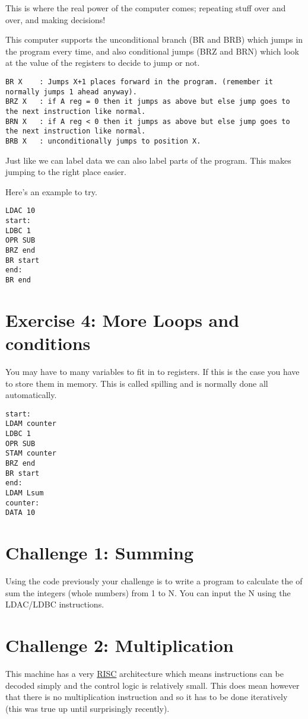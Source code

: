 \documentclass[10pt,a4paper]{article}
\begin{document}
This is where the real power of the computer comes; repeating stuff over and over, and making decisions!

This computer supports the unconditional branch (BR and BRB) which jumps in the program every time, and also conditional jumps (BRZ and BRN) which look at the value of the registers to decide to jump or not.
\begin{verbatim}
BR X	: Jumps X+1 places forward in the program. (remember it normally jumps 1 ahead anyway).
BRZ X 	: if A reg = 0 then it jumps as above but else jump goes to the next instruction like normal.
BRN X	: if A reg < 0 then it jumps as above but else jump goes to the next instruction like normal.
BRB X	: unconditionally jumps to position X.
\end{verbatim}

Just like we can label data we can also label parts of the program. This makes jumping to the right place easier.

Here's an example to try.
\begin{lstlisting}[frame=single]
LDAC 10
start:
LDBC 1
OPR SUB
BRZ end
BR start
end:
BR end
\end{lstlisting}

\section{Exercise 4: More Loops and conditions}
You may have to many variables to fit in to registers. If this is the case you have to store them in memory. This is called spilling and is normally done all automatically.

\begin{lstlisting}[frame=single]
start:
LDAM counter
LDBC 1
OPR SUB
STAM counter
BRZ end
BR start
end:
LDAM Lsum
counter:
DATA 10
\end{lstlisting}

\section{Challenge 1: Summing}
Using the code previously your challenge is to write a program to calculate the of sum the integers (whole numbers) from 1 to N. You can input the N using the LDAC/LDBC instructions.

\section{Challenge 2: Multiplication}
This machine has a very \href{https://en.wikipedia.org/wiki/Reduced_instruction_set_computing}{RISC} architecture which means instructions can be decoded simply and the control
logic is relatively small. This does mean however that there is no multiplication instruction and so it has to be
done iteratively (this was true up until surprisingly recently).
\end{document}
